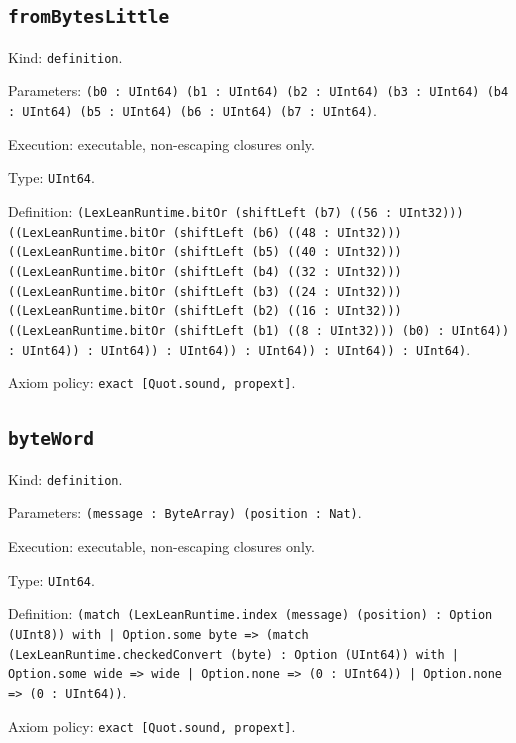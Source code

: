\documentclass[11pt]{article}
\begin{document}
\subsection*{\texttt{fromBytesLittle}}
\noindent Kind: \texttt{definition}.\par
\noindent Parameters: \texttt{(b0 : UInt64) (b1 : UInt64) (b2 : UInt64) (b3 : UInt64) (b4 : UInt64) (b5 : UInt64) (b6 : UInt64) (b7 : UInt64)}.\par
\noindent Execution: executable, non-escaping closures only.\par
\noindent Type: \texttt{UInt64}.\par
\noindent Definition: \texttt{(LexLeanRuntime.bitOr (shiftLeft (b7) ((56 : UInt32))) ((LexLeanRuntime.bitOr (shiftLeft (b6) ((48 : UInt32))) ((LexLeanRuntime.bitOr (shiftLeft (b5) ((40 : UInt32))) ((LexLeanRuntime.bitOr (shiftLeft (b4) ((32 : UInt32))) ((LexLeanRuntime.bitOr (shiftLeft (b3) ((24 : UInt32))) ((LexLeanRuntime.bitOr (shiftLeft (b2) ((16 : UInt32))) ((LexLeanRuntime.bitOr (shiftLeft (b1) ((8 : UInt32))) (b0) : UInt64)) : UInt64)) : UInt64)) : UInt64)) : UInt64)) : UInt64)) : UInt64)}.\par
\noindent Axiom policy: \texttt{exact [Quot.sound, propext]}.\par
\subsection*{\texttt{byteWord}}
\noindent Kind: \texttt{definition}.\par
\noindent Parameters: \texttt{(message : ByteArray) (position : Nat)}.\par
\noindent Execution: executable, non-escaping closures only.\par
\noindent Type: \texttt{UInt64}.\par
\noindent Definition: \texttt{(match (LexLeanRuntime.index (message) (position) : Option (UInt8)) with | Option.some byte => (match (LexLeanRuntime.checkedConvert (byte) : Option (UInt64)) with | Option.some wide => wide | Option.none => (0 : UInt64)) | Option.none => (0 : UInt64))}.\par
\noindent Axiom policy: \texttt{exact [Quot.sound, propext]}.\par
\end{document}
